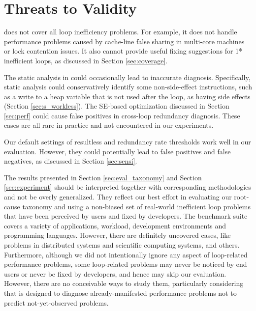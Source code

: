 \section{Threats to Validity}
\label{sec:threats}

\Tool does not cover all loop inefficiency problems.
For example, it does not handle performance problems caused by
cache-line false sharing in multi-core machines or lock
contention issues. It also cannot provide useful fixing 
suggestions for 1* inefficient loops, as discussed in 
Section \ref{sec:coverage}.

The static analysis in \Tool could occasionally lead to inaccurate diagnosis.
Specifically, \Tool static analysis could conservatively identify some
non-side-effect instructions, such as a write to a heap variable that
is not used after the loop, as having side effects 
(Section \ref{sec:s_workless}). 
The SE-based optimization discussed in Section \ref{sec:perf} could cause
false positives in cross-loop redundancy diagnosis.
These cases are all rare in practice and not encountered in our experiments.

Our default settings of resultless and redundancy rate thresholds 
work well in our evaluation. However, they could potentially lead to false 
positives and false negatives, as discussed in Section \ref{sec:sensi}.

The results presented in Section \ref{sec:eval_taxonomy}
and Section \ref{sec:experiment}
should be interpreted together with corresponding methodologies
and not be overly generalized.
They reflect our best effort in evaluating our root-cause
taxonomy and \Tool using a non-biased set of real-world inefficient loop 
problems that have been perceived by users and fixed by developers.
The benchmark suite covers a variety of applications, workload, 
development environments and programming languages. 
However, there are definitely uncovered cases, like problems in distributed systems
and scientific computing systems, and others. 
Furthermore, although
we did not intentionally ignore any aspect of loop-related performance problems,
some loop-related problems may never be noticed by end users
or never be fixed by developers, and hence may skip our evaluation. However,
there are no conceivable ways to study them, particularly considering that 
\Tool is designed to diagnose already-manifested performance problems not to
predict not-yet-observed problems.


